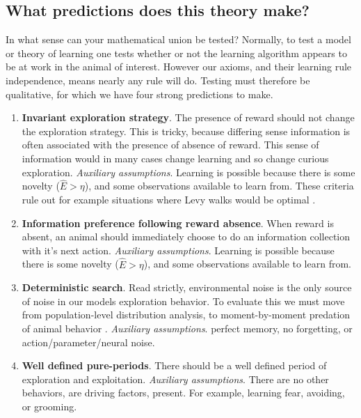 \subsection*{What predictions does this theory make?}
In what sense can your mathematical union be tested? Normally, to test a model or theory of learning one tests whether or not the learning algorithm appears to be at work in the animal of interest. However our axioms, and their learning rule independence, means nearly any rule will do. Testing must therefore be qualitative, for which we have four strong predictions to make. 


\begin{enumerate}
    \item \textbf{Invariant exploration strategy}. The presence of reward should not change the exploration strategy. This is tricky, because differing sense information is often associated with the presence of absence of reward. This sense of information would in many cases change learning and so change curious exploration. \emph{Auxiliary assumptions}. Learning is possible because there is some novelty ($\hat E > \eta$), and some observations available to learn from. These criteria rule out for example situations where Levy walks would be optimal \cite{Viswanathan2000}.
    \item \textbf{Information preference following reward absence}. When reward is absent, an animal should immediately choose to do an information collection with it's next action. \emph{Auxiliary assumptions}. Learning is possible because there is some novelty ($\hat E > \eta$), and some observations available to learn from.
    \item \textbf{Deterministic search}. Read strictly, environmental noise is the only source of noise in our models exploration behavior. To evaluate this we must move from population-level distribution analysis, to moment-by-moment predation of animal behavior \cite{Peters2016,Mangalam2021}. \emph{Auxiliary assumptions}. perfect memory, no forgetting, or action/parameter/neural noise.
    \item  \textbf{Well defined pure-periods}. There should be a well defined period of exploration and exploitation. \emph{Auxiliary assumptions}. There are no other behaviors, are driving factors, present. For example, learning fear, avoiding, or grooming.
\end{enumerate}

